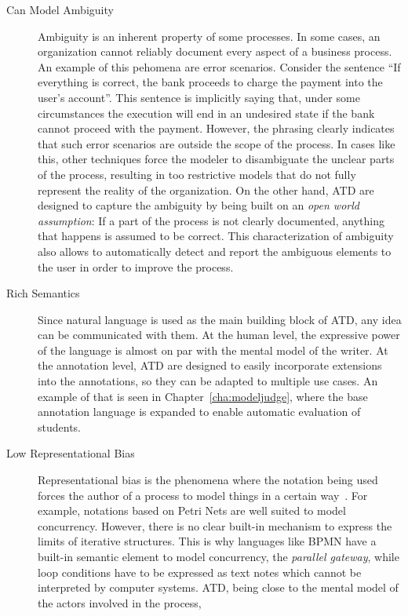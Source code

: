 \begin{description}
\item[Can Model Ambiguity] {Ambiguity is an inherent property of some processes.
    In some cases, an organization cannot reliably document every aspect of a
    business process. An example of this pehomena are error scenarios. Consider
    the sentence ``If everything is correct, the bank proceeds to charge the
    payment into the user's account''. This sentence is implicitly saying that,
    under some circumstances the execution will end in an undesired state if the
    bank cannot proceed with the payment. However, the phrasing clearly
    indicates that such error scenarios are outside the scope of the process. In
    cases like this, other techniques force the modeler to disambiguate the
    unclear parts of the process, resulting in too restrictive models that do
    not fully represent the reality of the organization. On the other hand, ATD
    are designed to capture the ambiguity by being built on an \emph{open
      world assumption}: If a part of the process is not clearly documented,
    anything that happens is assumed to be correct. This characterization of
    ambiguity also allows to automatically detect and report the ambiguous
    elements to the user in order to improve the process.}
\item[Rich Semantics]{Since natural language is used as the main building block
    of ATD, any idea can be communicated with them. At the human level, the
    expressive power of the language is almost on par with the mental model of
    the writer. At the annotation level, ATD are designed to easily incorporate
    extensions into the annotations, so they can be adapted to multiple use
    cases. An example of that is seen in Chapter~\ref{cha:modeljudge}, where the
    base annotation language is expanded to enable automatic evaluation of
    students.}
\item[Low Representational Bias]{Representational bias is the phenomena where
    the notation being used forces the author of a process to model things in a
    certain way~\cite{van2011representational}. For example, notations based on
    Petri Nets are well suited to model concurrency. However, there is no clear
    built-in mechanism to express the limits of iterative structures. This is
    why languages like BPMN have a built-in semantic element to model
    concurrency, the \emph{parallel gateway}, while loop conditions have to be
    expressed as text notes which cannot be interpreted by computer systems.
    ATD, being close to the mental model of the actors involved in the process,
}
\end{description}
